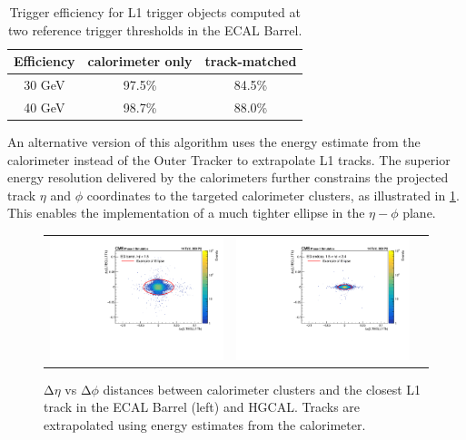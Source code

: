 \begin{table}[th]
\sffamily
\centering
\caption{Trigger efficiency for \ac{L1} trigger objects computed at two reference trigger thresholds in the \ac{ECAL} Barrel. }
\begin{tabular}{ccc} \toprule
Efficiency & calorimeter only & track-matched \\  \midrule
 30 GeV   & 97.5\%   & 84.5\%\\ \midrule
 40 GeV & 98.7\%   & 88.0\%\\ \bottomrule
\end{tabular}
\label{tab:L1EleEff}
\end{table}

An alternative version of this algorithm uses the energy estimate from the calorimeter instead of the Outer Tracker to extrapolate \ac{L1} tracks. The superior energy resolution delivered by the calorimeters further constrains the projected track $\eta$ and $\phi$ coordinates to the targeted calorimeter clusters, as illustrated in \ref{fig:DR_electron}. This enables the implementation of a much tighter ellipse in the $\eta-\phi$ plane.

\begin{figure}[tbh!]
 \begin{center}
 \begin{tabular}{ccc}
  \includegraphics[width=.45\linewidth]{figures/Part2/Upgrade/DR_barrel_new}&
  \includegraphics[width=.45\linewidth]{figures/Part2/Upgrade/DR_endcap_new}&
 \end{tabular}
 \caption{$\mathrm{\Delta}\eta$ vs $\mathrm{\Delta}\phi$ distances between calorimeter clusters and the closest L1 track in the \ac{ECAL} Barrel (left) and \ac{HGCAL}. Tracks are extrapolated using energy estimates from the calorimeter.}
 \label{fig:DR_electron}
 \end{center}
\end{figure}

